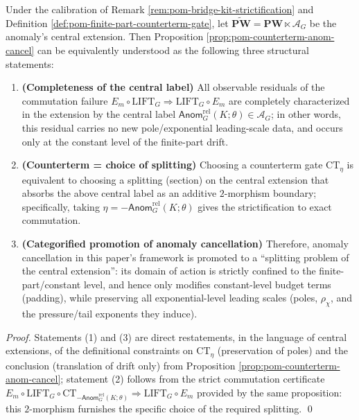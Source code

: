 \begin{theorem}\label{thm:pom-strictification-splitting}
Under the calibration of Remark \ref{rem:pom-bridge-kit-strictification} and Definition \ref{def:pom-finite-part-counterterm-gate}, let
\(
\widetilde{\mathbf{PW}}=\mathbf{PW}\ltimes \mathcal{A}_G
\)
be the anomaly's central extension.
Then Proposition \ref{prop:pom-counterterm-anom-cancel} can be equivalently understood as the following three structural statements:
\begin{enumerate}
  \item \textbf{(Completeness of the central label)} All observable residuals of the commutation failure \(E_m\circ \mathrm{LIFT}_G \Rightarrow \mathrm{LIFT}_G\circ E_m\) are completely characterized in the extension by the central label
  \(\mathsf{Anom}^{\mathrm{rel}}_{G}(K;\theta)\in\mathcal{A}_G\);
  in other words, this residual carries no new pole/exponential leading-scale data, and occurs only at the constant level of the finite-part drift.
  \item \textbf{(Counterterm = choice of splitting)} Choosing a counterterm gate \(\mathrm{CT}_\eta\) is equivalent to choosing a splitting (section) on the central extension that absorbs the above central label as an additive \(2\)-morphism boundary; specifically, taking
  \(\eta=-\mathsf{Anom}^{\mathrm{rel}}_{G}(K;\theta)\)
  gives the strictification to exact commutation.
  \item \textbf{(Categorified promotion of anomaly cancellation)} Therefore, anomaly cancellation in this paper's framework is promoted to a ``splitting problem of the central extension'': its domain of action is strictly confined to the finite-part/constant level, and hence only modifies constant-level budget terms (padding), while preserving all exponential-level leading scales (poles, \(\rho_\chi\), and the pressure/tail exponents they induce).
\end{enumerate}
\end{theorem}

\begin{proof}
Statements (1) and (3) are direct restatements, in the language of central extensions, of the definitional constraints on \(\mathrm{CT}_\eta\) (preservation of poles) and the conclusion (translation of drift only) from Proposition \ref{prop:pom-counterterm-anom-cancel}; statement (2) follows from the strict commutation certificate
\(
E_m\circ \mathrm{LIFT}_G\circ \mathrm{CT}_{-\mathsf{Anom}^{\mathrm{rel}}_{G}(K;\theta)}
\Rightarrow
\mathrm{LIFT}_G\circ E_m
\)
provided by the same proposition: this \(2\)-morphism furnishes the specific choice of the required splitting. \qed
\end{proof}

